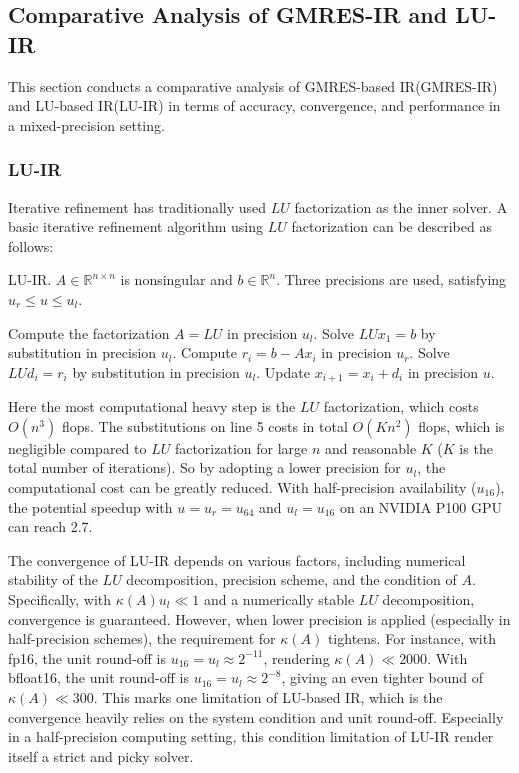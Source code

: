 \subsection{Comparative Analysis of GMRES-IR and LU-IR}
\label{subsec:comparison}

This section conducts a comparative analysis of GMRES-based IR(GMRES-IR) and LU-based IR(LU-IR) in terms of accuracy, convergence, and performance in a mixed-precision setting.
\subsubsection{LU-IR}
Iterative refinement has traditionally used $LU$ factorization as the inner solver. A basic iterative refinement algorithm using $LU$ factorization can be described as follows:

\begin{algorithm}
    \caption{LU-IR. $A \in \mathbb{R}^{n \times n}$ is nonsingular and $b \in \mathbb{R}^n$. Three precisions are used, satisfying $u_r \leq u \leq u_l$.}
    \begin{algorithmic}[1]
        \State Compute the factorization $A = LU$ in precision $u_l$.
        \State Solve $LUx_1 = b$ by substitution in precision $u_l$.
            \State Compute $r_i = b - Ax_i$ in precision $u_r$.
            \State Solve $LUd_i = r_i$ by substitution in precision $u_l$.
            \State Update $x_{i+1} = x_i + d_i$ in precision $u$.
        \EndFor
    \end{algorithmic}
\end{algorithm}

Here the most computational heavy step is the $LU$ factorization, which costs $O(n^3)$ flops. The substitutions on line 5 costs in total $O(Kn^2)$ flops, which is negligible compared to $LU$ factorization for large $n$ and reasonable $K$ ($K$ is the total number of iterations). So by adopting a lower precision for $u_l$, the computational cost can be greatly reduced. With half-precision availability ($u_{16}$), the potential speedup with $u=u_r=u_{64}$ and $u_l=u_{16}$ on an NVIDIA P100 GPU can reach 2.7\cite{Haidar2017}. 

The convergence of LU-IR depends on various factors, including numerical stability of the $LU$ decomposition, precision scheme, and the condition of $A$. Specifically, with $\kappa(A)u_l \ll 1$ and a numerically stable $LU$ decomposition, convergence is guaranteed. However, when lower precision is applied (especially in half-precision schemes), the requirement for $\kappa(A)$ tightens. For instance, with fp16, the unit round-off is $u_{16}=u_l\approx 2^{-11}$, rendering $\kappa(A)\ll 2000$. With bfloat16, the unit round-off is $u_{16}=u_l\approx 2^{-8}$, giving an even tighter bound of $\kappa(A)\ll 300$\cite{Azzam2020}. This marks one limitation of LU-based IR, which is the convergence heavily relies on the system condition and unit round-off. Especially in a half-precision computing setting, this condition limitation of LU-IR render itself a strict and picky solver.

